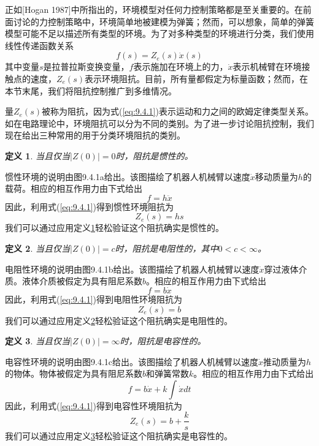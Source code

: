 \documentclass[12pt,a4paper]{ctexart}
\newtheorem{definition}{定义}[section]
\begin{document}
正如[Hogan 1987]中所指出的，环境模型对任何力控制策略都是至关重要的。在前面讨论的力控制策略中，环境简单地被建模为弹簧；然而，可以想象，简单的弹簧模型可能不足以描述所有类型的环境。为了对多种类型的环境进行分类，我们使用线性传递函数关系
\begin{equation}\label{eq:9.4.1}
f(s) = Z_e(s)\dot{x}(s)
\end{equation}
其中变量$s$是拉普拉斯变换变量，$f$表示施加在环境上的力，$\dot{x}$表示机械臂在环境接触点的速度，$Z_e(s)$表示环境阻抗。目前，所有量都假定为标量函数；然而，在本节末尾，我们将阻抗控制推广到多维情况。

量$Z_e(s)$被称为阻抗，因为式(\ref{eq:9.4.1})表示运动和力之间的欧姆定律类型关系。如在电路理论中，环境阻抗可以分为不同的类别。为了进一步讨论阻抗控制，我们现在给出三种常用的用于分类环境阻抗的类别。

\begin{definition}\label{def:9.4.1}
当且仅当$|Z(0)| = 0$时，阻抗是惯性的。
\end{definition}

惯性环境的说明由图9.4.1a给出。该图描绘了机器人机械臂以速度$\dot{x}$移动质量为$h$的载荷。相应的相互作用力由下式给出
\[
f = h\ddot{x}
\]
因此，利用式(\ref{eq:9.4.1})得到惯性环境阻抗为
\begin{equation}\label{eq:9.4.2}
Z_e(s) = hs
\end{equation}
我们可以通过应用定义\ref{def:9.4.1}轻松验证这个阻抗确实是惯性的。

\begin{definition}\label{def:9.4.2}
当且仅当$|Z(0)| = c$时，阻抗是电阻性的，其中$0 < c < \infty$。
\end{definition}

电阻性环境的说明由图9.4.1b给出。该图描绘了机器人机械臂以速度$\dot{x}$穿过液体介质。液体介质被假定为具有阻尼系数$b$。相应的相互作用力由下式给出
\[
f = b\dot{x}
\]
因此，利用式(\ref{eq:9.4.1})得到电阻性环境阻抗为
\begin{equation}\label{eq:9.4.3}
Z_e(s) = b
\end{equation}
我们可以通过应用定义\ref{def:9.4.2}轻松验证这个阻抗确实是电阻性的。

\begin{definition}\label{def:9.4.3}
当且仅当$|Z(0)| = \infty$时，阻抗是电容性的。
\end{definition}

电容性环境的说明由图9.4.1c给出。该图描绘了机器人机械臂以速度$\dot{x}$推动质量为$h$的物体。物体被假定为具有阻尼系数$b$和弹簧常数$k$。相应的相互作用力由下式给出
\[
f = b\dot{x} + k\int \dot{x} dt
\]
因此，利用式(\ref{eq:9.4.1})得到电容性环境阻抗为
\begin{equation}\label{eq:9.4.4}
Z_e(s) = b + \frac{k}{s}
\end{equation}
我们可以通过应用定义\ref{def:9.4.3}轻松验证这个阻抗确实是电容性的。
\end{document}
